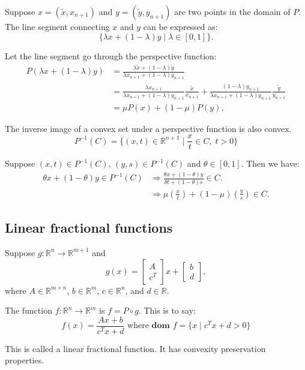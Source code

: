 \documentclass[lang=en,color=blue,mode=fancy,titlestyle=hang]{elegantbook}
\begin{document}
Suppose $x = (\tilde{x}, x_{n+1})$ and $y = (\tilde{y}, y_{n+1})$ are two points in the domain of $P$. The line segment connecting $x$ and $y$ can be expressed as:
\[
\{ \lambda x + (1 - \lambda) y \;|\; \lambda \in [0, 1]\}.
\]

Let the line segment go through the perspective function:
\begin{align*}
P(\lambda x + (1 - \lambda) y) &= \frac{\lambda \tilde{x} + (1 - \lambda) \tilde{y}}{\lambda x_{n+1} + (1 - \lambda) y_{n+1}} \\
&= \frac{\lambda x_{n+1}}{\lambda x_{n+1} + (1 - \lambda) y_{n+1}}\frac{\tilde{x}}{x_{n+1}} + \frac{(1 - \lambda) y_{n+1}}{\lambda x_{n+1} + (1 - \lambda) y_{n+1}}\frac{\tilde{y}}{y_{n+1}} \\
&= \mu P(x) + (1 - \mu) P(y),
\end{align*}

The inverse image of a convex set under a perspective function is also convex.
\[
P^{-1}(C) = \{ (x, t) \in \mathbb{R}^{n+1} \;|\; \frac{x}{t} \in C, \; t > 0\}
\]

Suppose $(x, t) \in P^{-1}(C)$, $(y, s) \in P^{-1}(C)$ and $\theta \in [0, 1]$. Then we have:
\begin{align*}
\theta x + (1 - \theta) y \in P^{-1}(C) &\Rightarrow \frac{\theta x + (1 - \theta) y}{\theta t + (1 - \theta) s} \in C. \\
&\Rightarrow \mu(\frac{x}{t}) + (1 - \mu)(\frac{y}{s}) \in C.
\end{align*}

\subsection{Linear fractional functions}

Suppose $g: \mathbb{R}^n \rightarrow \mathbb{R}^{m+1}$ and
\[
g(x)= \begin{bmatrix} A\\ c^T \end{bmatrix} x + \begin{bmatrix} b \\ d \end{bmatrix},
\]
where $A \in \mathbb{R}^{m \times n}$, $b \in \mathbb{R}^m$, $c \in \mathbb{R}^n$, and
$d \in \mathbb{R}$.

The function $f: \mathbb{R}^n \rightarrow \mathbb{R}^m$ is $f = P \circ g$. This is to say:
\[
f(x) = \frac{Ax + b}{c^{T}x + d} \text{ where } \textbf{dom } f = \{x \;|\; c^{T}x + d > 0\}
\]

This is called a linear fractional function. It has convexity preservation properties.
\end{document}
